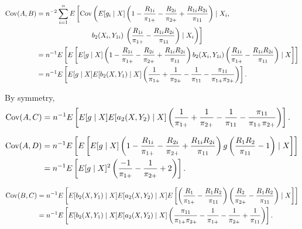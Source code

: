 \begin{itemize}
    \begin{align*}
      {\text{Cov}}(A, B) &= n^{-2} \sum_{i = 1}^n E\left[{\text{Cov}}\left(E[g_i \mid X] \left(1
      - \frac{R_{1i}}{\pi_{1+}} - \frac{R_{2i}}{\pi_{2+}} +
      \frac{R_{1i}R_{2i}}{\pi_{11}}\right) \mid X_i,\right. \right.\\
      &\qquad \qquad \qquad \qquad b_2(X_i, Y_{1i}) \left. \left.
      \left(\frac{R_{1i}}{\pi_{1+}} - \frac{R_{1i}R_{2i}}{\pi_{11}}\right) \mid
      X_i\right)\right]\\
      &= n^{-1} E\left[E\left[E[g \mid X] \left(1 - \frac{R_{1i}}{\pi_{1+}} -
      \frac{R_{2i}}{\pi_{2+}} + \frac{R_{1i}R_{2i}}{\pi_{11}}\right)
      b_2(X_i, Y_{1i}) \left(\frac{R_{1i}}{\pi_{1+}} -
      \frac{R_{1i}R_{2i}}{\pi_{11}}\right) \mid X \right]\right] \\
      &= n^{-1} E\left[E[g \mid X] E[b_2(X, Y_1) \mid X]
      \left(\frac{1}{\pi_{1+}} + \frac{1}{\pi_{2+}} - \frac{1}{\pi_{11}} -
      \frac{\pi_{11}}{\pi_{1+} \pi_{2+}}\right)\right].
    \end{align*}

    By symmetry,
    \begin{align*}
      {\text{Cov}}(A, C) 
      &= n^{-1} E\left[E[g \mid X] E[a_2(X, Y_2) \mid X]
      \left(\frac{1}{\pi_{1+}} + \frac{1}{\pi_{2+}} - \frac{1}{\pi_{11}} -
      \frac{\pi_{11}}{\pi_{1+} \pi_{2+}}\right)\right].
    \end{align*}

    \begin{align*}
      {\text{Cov}}(A, D) &= n^{-1} E\left[E\left[E[g \mid X] \left(1 -
      \frac{R_{1i}}{\pi_{1+}} - \frac{R_{2i}}{\pi_{2+}} +
      \frac{R_{1i}R_{2i}}{\pi_{11}}\right) g \left(\frac{R_1 R_2}{\pi_{11}} -
      1\right) \mid X\right] \right]\\
      &= n^{-1} E\left[E[g \mid X]^2 \left(\frac{-1}{\pi_{1+}} -
      \frac{1}{\pi_{2+}} + 2\right)\right].
    \end{align*}

    \begin{align*}
      {\text{Cov}}(B, C) &= n^{-1} E\left[E[b_2(X, Y_1) \mid X] E[a_2(X, Y_2) \mid X]
      E\left[\left(\frac{R_1}{\pi_{1+}} - \frac{R_1 R_2}{\pi_{11}}\right)
      \left(\frac{R_2}{\pi_{2+}} - \frac{R_1 R_2}{\pi_{11}}\right) \mid
      X\right]\right]\\
      &= n^{-1} E\left[E[b_2(X, Y_1) \mid X] E[a_2(X, Y_2) \mid X]
      \left(\frac{\pi_{11}}{\pi_{1+} \pi_{2+}} - \frac{1}{\pi_{1+}} -
      \frac{1}{\pi_{2+}} + \frac{1}{\pi_{11}}\right)\right].
    \end{align*}


\end{itemize}
